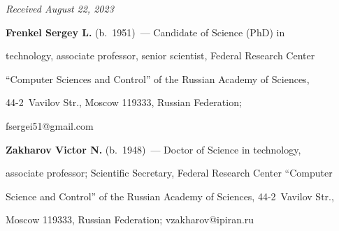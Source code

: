 \vspace*{-8pt}





\hfill{\small\textit{Received August 22, 2023}} 





\vspace*{-14pt}








\Contr





\vspace*{-4pt}





\noindent


\textbf{Frenkel Sergey L.} (b.\ 1951)~--- Candidate of Science (PhD) in 


technology, associate professor, senior scientist, Federal Research Center 


``Computer Sciences and Control'' of the Russian Academy of Sciences,  


44-2~Vavilov Str., Moscow 119333, Russian Federation; 


\mbox{fsergei51@gmail.com}





\vspace*{3pt}





\noindent


\textbf{Zakharov Victor N.} (b.\ 1948)~--- Doctor of Science in technology, 


associate professor; Scientific Secretary, Federal Research Center ``Computer 


Science and Control'' of the Russian Academy of Sciences, 44-2~Vavilov Str., 


Moscow 119333, Russian Federation; \mbox{vzakharov@ipiran.ru}











\label{end\stat}





\renewcommand{\bibname}{\protect\rm Литература} 


